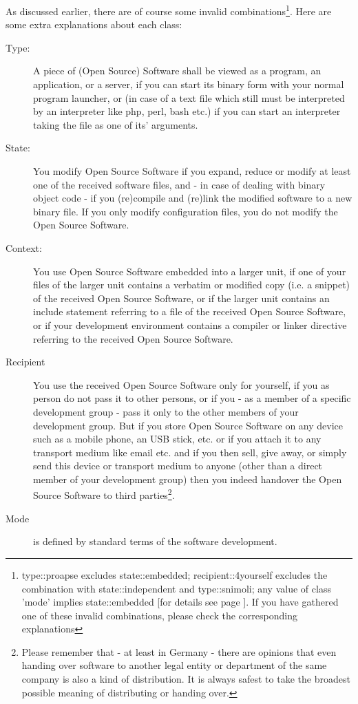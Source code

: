 As discussed earlier, there are of course some invalid
combinations\footnote{type::proapse excludes state::embedded;
recipient::4yourself excludes the combination with state::independent and
type::snimoli; any value of class 'mode' implies state::embedded [for details
see page \pageref{InvalidFinderTokenCombinations}]. If you have gathered one of
these invalid combinations, please check the corresponding explanations}. Here
are some extra explanations about each class:

\begin{description}
\item[Type:] A piece of (Open Source) Software shall be viewed as a program, an
application, or a server, if you can start its binary form with your normal
program launcher, or (in case of a text file which still must be interpreted by
an interpreter like php, perl, bash etc.) if you can start an interpreter taking
the file as one of its' arguments. \item[State:] You modify Open Source Software
if you expand, reduce or modify at least one of the received software files, and
- in case of dealing with binary object code - if you (re)compile and (re)link
the modified software to a new binary file. If you only modify configuration
files, you do not modify the Open Source Software.
\item[Context:] You use Open Source Software embedded into a larger unit, if one
of your files of the larger unit contains a verbatim or modified copy (i.e. a
snippet) of the received Open Source Software, or if the larger unit contains an
include statement referring to a file of the received Open Source Software, or
if your development environment contains a compiler or linker directive
referring to the received Open Source Software.
\item[Recipient] You use the received Open Source Software only for yourself, if
you as person do not pass it to other persons, or if you - as a member of a
specific development group - pass it only to the other members of your
development group. But if you store Open Source Software on any device such as a
mobile phone, an USB stick, etc. or if you attach it to any transport
medium like email etc. and if you then sell, give away, or simply send this
device or transport medium to anyone (other than a direct member
of your development group) then you indeed handover the Open Source Software to
third parties\footnote{Please remember that - at least in Germany - there are
opinions that even handing over software to another legal entity or department
of the same company is also a kind of distribution. It is always safest
to take the broadest possible meaning of distributing or handing over.}.
\item[Mode] is defined by standard terms of the software development.
\end{description}

